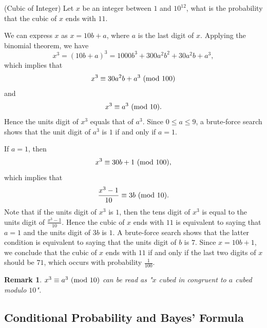 \documentclass[12pt,letterpaper, onecolumn]{exam}
\newtheorem{remark}{Remark}
\begin{document}
\begin{questions}
    \question[](Cubic of Integer) Let $x$ be an integer between $1$ and $10^{12}$, what is the probability that the cubic of $x$ ends with $11$.
    \begin{solution}
        We can express $x$ as $x=10b+a$, where $a$ is the last digit of $x$. Applying the binomial theorem, we have 
        $$x^3=(10b+a)^3=1000b^3+300a^2b^2+30a^2b+a^3,$$
        which implies that 
        $$x^3\equiv 30a^2b+a^3\ ({\rm{mod}}\ 100)$$
        and
        $$x^3\equiv a^3\ ({\rm{mod}}\ 10).$$
        Hence the units digit of $x^3$ equals that of $a^3$. Since $0\le a\le 9$, a brute-force search shows that the unit digit of $a^3$ is $1$ if and only if $a=1$. 
        
        \quad If $a=1$, then
        $$x^3\equiv 30b+1\ ({\rm{mod}}\ 100),$$
        which implies that 
        $$\frac{x^3-1}{10}\equiv 3b\ ({\rm{mod}}\ 10).$$
        Note that if the units digit of $x^3$ is $1$, then the tens digit of $x^3$ is equal to the units digit of $\frac{x^3-1}{10}$. Hence the cubic of $x$ ends with $11$ is equivalent to saying that $a=1$ and the units digit of $3b$ is $1$. A brute-force search shows that the latter condition is equivalent to saying that the units digit of $b$ is $7$. Since $x=10b+1$, we conclude that the cubic of $x$ ends with $11$ if and only if the last two digits of $x$ should be $71$, which occurs with probability $\frac{1}{100}$.
    \end{solution}
    \begin{remark}
       $x^3\equiv a^3\ ({\rm{mod}}\ 10)$ can be read as "$x$ cubed in congruent to $a$ cubed modulo $10$".
    \end{remark}
\end{questions}



\subsection{Conditional Probability and Bayes' Formula}
\end{document}
